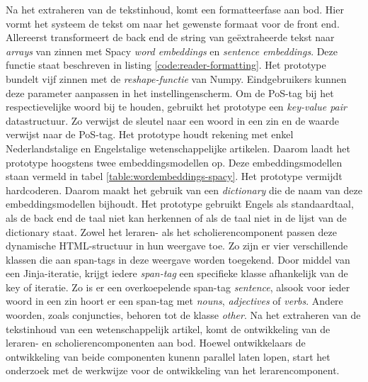 Na het extraheren van de tekstinhoud, komt een formatteerfase aan bod. Hier vormt het systeem de tekst om naar het gewenste formaat voor de front end. Allereerst transformeert de back end de string van geëxtraheerde tekst naar \textit{arrays} van zinnen met Spacy \textit{word embeddings} en \textit{sentence embeddings}. Deze functie staat beschreven in listing \ref{code:reader-formatting}. Het prototype bundelt vijf zinnen met de \textit{reshape-functie} van Numpy. Eindgebruikers kunnen deze parameter aanpassen in het instellingenscherm. Om de PoS-tag bij het respectievelijke woord bij te houden, gebruikt het prototype een \textit{key-value pair} datastructuur. Zo verwijst de sleutel naar een woord in een zin en de waarde verwijst naar de PoS-tag. Het prototype houdt rekening met enkel Nederlandstalige en Engelstalige wetenschappelijke artikelen. Daarom laadt het prototype hoogstens twee embeddingsmodellen op. Deze embeddingsmodellen staan vermeld in tabel \ref{table:wordembeddings-spacy}. Het prototype vermijdt hardcoderen. Daarom maakt het gebruik van een \textit{dictionary} die de naam van deze embeddingsmodellen bijhoudt. Het prototype gebruikt Engels als standaardtaal, als de back end de taal niet kan herkennen of als de taal niet in de lijst van de dictionary staat. Zowel het leraren- als het scholierencomponent passen deze dynamische HTML-structuur in hun weergave toe. Zo zijn er vier verschillende klassen die aan span-tags in deze weergave worden toegekend. Door middel van een Jinja-iteratie, krijgt iedere \textit{span-tag} een specifieke klasse afhankelijk van de key of iteratie. Zo is er een overkoepelende span-tag \textit{sentence}, alsook voor ieder woord in een zin hoort er een span-tag met \textit{nouns}, \textit{adjectives} of \textit{verbs}. Andere woorden, zoals conjuncties, behoren tot de klasse \textit{other}. Na het extraheren van de tekstinhoud van een wetenschappelijk artikel, komt de ontwikkeling van de leraren- en scholierencomponenten aan bod. Hoewel ontwikkelaars de ontwikkeling van beide componenten kunenn parallel laten lopen, start het onderzoek met de werkwijze voor de ontwikkeling van het lerarencomponent.

